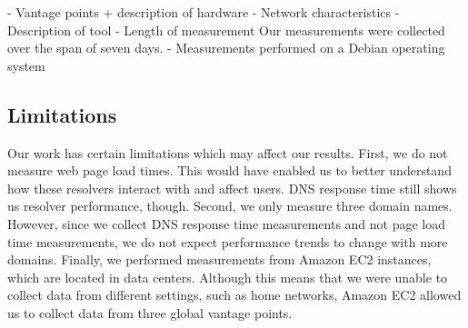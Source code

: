 - Vantage points + description of hardware
- Network characteristics
- Description of tool
- Length of measurement
Our measurements were collected over the span of seven days. 
- Measurements performed on a Debian operating system 

\subsection{Limitations}
Our work has certain limitations which may affect our results. 
First, we do not measure web page load times. 
This would have enabled us to better understand how these resolvers interact with and affect users. 
DNS response time still shows us resolver performance, though. 
Second, we only measure three domain names. 
However, since we collect DNS response time measurements and not page load time measurements, we do not expect performance trends to change with more domains.
Finally, we performed measurements from Amazon EC2 instances, which are located in data centers. 
Although this means that we were unable to collect data from different settings, such as home networks, Amazon EC2 allowed us to collect data from three global vantage points. 
